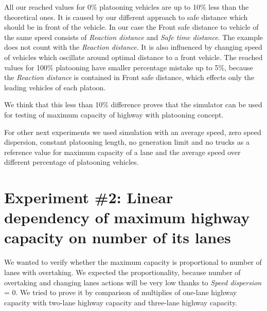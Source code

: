 All our reached values for 0\% platooning vehicles are up to 10\% less than the theoretical ones. It is caused by our different approach to safe distance which should be in front of the vehicle. In our case the Front safe distance to vehicle of the same speed consists of \textit{Reaction distance} and \textit{Safe time distance}. The example does not count with the \textit{Reaction distance}. It is also influenced by changing speed of vehicles which oscillate around optimal distance to a front vehicle. The reached values for 100\% platooning have smaller percentage mistake up to 5\%, because the \textit{Reaction distance} is contained in Front safe distance, which effects only the leading vehicles of each platoon. 

We think that this less than 10\% difference proves that the simulator can be used for testing of maximum capacity of highway with platooning concept.

For other next experiments we used simulation with an average speed, zero speed dispersion, constant platooning length, no generation limit and no trucks as a reference value for maximum capacity of a lane and the average speed over different percentage of platooning vehicles.

















\newpage

\section[Experiment \#2: Linear dependency of maximum highway capacity on number of its lanes]{Experiment \#2: Linear dependency of maximum highway capacity on number of its lanes}

We wanted to verify whether the maximum capacity is proportional to number of lanes with overtaking. We expected the proportionality, because number of overtaking and changing lanes actions will be very low thanks to \textit{Speed dispersion} = 0. We tried to prove it by comparison of multiplies of one-lane highway capacity with two-lane highway capacity and three-lane highway capacity.







